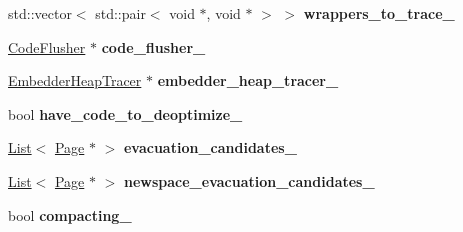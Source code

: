 \begin{DoxyCompactItemize}
\item 
std\+::vector$<$ std\+::pair$<$ void $\ast$, void $\ast$ $>$ $>$ {\bfseries wrappers\+\_\+to\+\_\+trace\+\_\+}\hypertarget{classv8_1_1internal_1_1_mark_compact_collector_a653ea1b9ae6eea70d590327b0c29ed61}{}\label{classv8_1_1internal_1_1_mark_compact_collector_a653ea1b9ae6eea70d590327b0c29ed61}

\item 
\hyperlink{classv8_1_1internal_1_1_code_flusher}{Code\+Flusher} $\ast$ {\bfseries code\+\_\+flusher\+\_\+}\hypertarget{classv8_1_1internal_1_1_mark_compact_collector_a77687635567bee54448c8ad241588a09}{}\label{classv8_1_1internal_1_1_mark_compact_collector_a77687635567bee54448c8ad241588a09}

\item 
\hyperlink{classv8_1_1_embedder_heap_tracer}{Embedder\+Heap\+Tracer} $\ast$ {\bfseries embedder\+\_\+heap\+\_\+tracer\+\_\+}\hypertarget{classv8_1_1internal_1_1_mark_compact_collector_a72420934d0f44178931b65865c174009}{}\label{classv8_1_1internal_1_1_mark_compact_collector_a72420934d0f44178931b65865c174009}

\item 
bool {\bfseries have\+\_\+code\+\_\+to\+\_\+deoptimize\+\_\+}\hypertarget{classv8_1_1internal_1_1_mark_compact_collector_a2bf16e5a4b1908c7abfc22383d37980f}{}\label{classv8_1_1internal_1_1_mark_compact_collector_a2bf16e5a4b1908c7abfc22383d37980f}

\item 
\hyperlink{classv8_1_1internal_1_1_list}{List}$<$ \hyperlink{classv8_1_1internal_1_1_page}{Page} $\ast$ $>$ {\bfseries evacuation\+\_\+candidates\+\_\+}\hypertarget{classv8_1_1internal_1_1_mark_compact_collector_a7ecc687ae7e8d1d8cae09316b7348a78}{}\label{classv8_1_1internal_1_1_mark_compact_collector_a7ecc687ae7e8d1d8cae09316b7348a78}

\item 
\hyperlink{classv8_1_1internal_1_1_list}{List}$<$ \hyperlink{classv8_1_1internal_1_1_page}{Page} $\ast$ $>$ {\bfseries newspace\+\_\+evacuation\+\_\+candidates\+\_\+}\hypertarget{classv8_1_1internal_1_1_mark_compact_collector_aeb986f869a02f6770dffe8e58e28123f}{}\label{classv8_1_1internal_1_1_mark_compact_collector_aeb986f869a02f6770dffe8e58e28123f}

\item 
bool {\bfseries compacting\+\_\+}\hypertarget{classv8_1_1internal_1_1_mark_compact_collector_ade96b53880b218eba9217ef4f296dcdf}{}\label{classv8_1_1internal_1_1_mark_compact_collector_ade96b53880b218eba9217ef4f296dcdf}


\end{DoxyCompactItemize}
